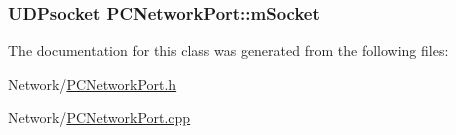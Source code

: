 \subsubsection[{\texorpdfstring{m\+Socket}{mSocket}}]{\setlength{\rightskip}{0pt plus 5cm}U\+D\+Psocket P\+C\+Network\+Port\+::m\+Socket\hspace{0.3cm}{\ttfamily [private]}}\hypertarget{classPCNetworkPort_a45c3b01c98b0a718a520f7b238e5a525}{}\label{classPCNetworkPort_a45c3b01c98b0a718a520f7b238e5a525}


The documentation for this class was generated from the following files\+:\begin{DoxyCompactItemize}
\item 
Network/\hyperlink{PCNetworkPort_8h}{P\+C\+Network\+Port.\+h}\item 
Network/\hyperlink{PCNetworkPort_8cpp}{P\+C\+Network\+Port.\+cpp}\end{DoxyCompactItemize}
